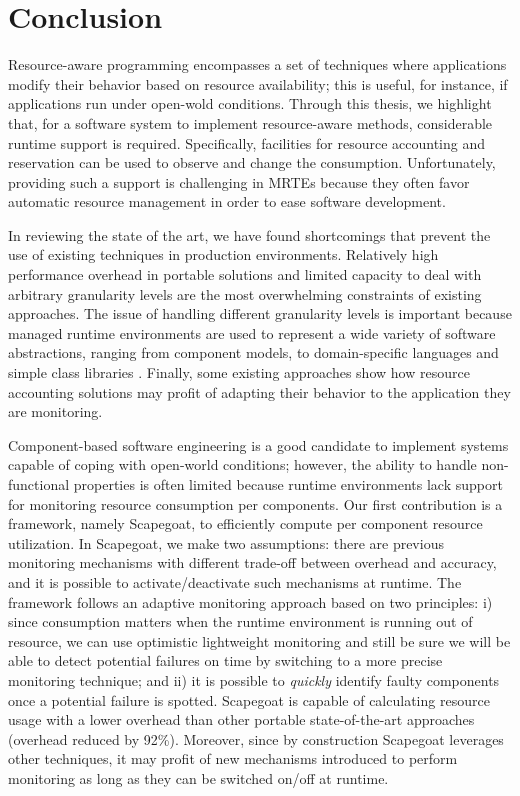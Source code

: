 \section{Conclusion} \label{sec:thesis-conclusions}

Resource-aware programming encompasses a set of techniques where applications modify their behavior based on resource availability;
this is useful, for instance, if applications run under open-wold conditions.
Through this thesis, we highlight that, for a software system to implement resource-aware methods, considerable runtime support is required.
Specifically, facilities for resource accounting and reservation can be used to observe and change the consumption.
Unfortunately, providing such a support is challenging in MRTEs because they often favor automatic resource management in order to ease software development.

In reviewing the state of the art, we have found shortcomings that prevent the use of existing techniques in production environments.
Relatively high performance overhead in portable solutions and limited capacity to deal with arbitrary granularity levels are the most overwhelming constraints of existing approaches.
The issue of handling different granularity levels is important because managed runtime environments are used to represent a wide variety of software abstractions, ranging from component models, to domain-specific languages and simple class libraries .
Finally, some existing approaches show how resource accounting solutions may profit of adapting their behavior to the application they are monitoring.

Component-based software engineering is a good candidate to implement systems capable of coping with open-world conditions; however, the ability to handle non-functional properties is often limited because runtime environments lack support for monitoring resource consumption per components.
Our first contribution is a framework, namely Scapegoat, to efficiently compute per component resource utilization.
In Scapegoat, we make two assumptions: there are previous monitoring mechanisms with different trade-off between overhead and accuracy, and
it is possible to activate/deactivate such mechanisms at runtime.
The framework follows an adaptive monitoring approach based on two principles: i) since consumption matters when the runtime environment is running out
of resource, we can use optimistic lightweight monitoring and still be sure we will be able to detect potential failures on time by switching to a more precise monitoring technique; and ii) it is possible to \textit{quickly} identify faulty components once a potential failure is spotted.
Scapegoat is capable of calculating resource usage with a lower overhead than other portable state-of-the-art approaches (overhead reduced by 92\%).
Moreover, since by construction Scapegoat leverages other techniques, it may profit of new mechanisms introduced to perform monitoring as long as they can be switched on/off at runtime.   

